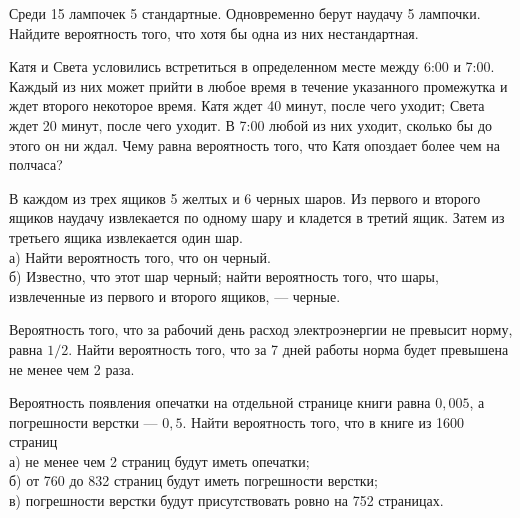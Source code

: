 \newpage\setcounter{zad}{0}



\begin{zkrW}{20}\noindent 
	Среди 15 лампочек 5 стандартные. Одновременно берут наудачу 5 лампочки. Найдите вероятность того, что хотя бы одна из них нестандартная.
 
\end{zkrW}

\begin{zkrW}{20}\noindent 
	Катя и Света условились встретиться в определенном месте между 6:00 и 7:00. Каждый из них может прийти в любое время в течение указанного промежутка и ждет второго некоторое время. Катя ждет 40 минут, после чего уходит; Света ждет 20 минут, после чего уходит. В 7:00 любой из них уходит, сколько бы до этого он ни ждал. Чему равна вероятность того, что Катя опоздает более чем на полчаса?
 
\end{zkrW}

\begin{zkrW}{20}\noindent 
	В каждом из трех ящиков 5 желтых и 6 черных шаров. Из первого и второго ящиков наудачу извлекается по одному шару и кладется в третий ящик. Затем из третьего ящика извлекается один шар. \\ \indent а) Найти вероятность того, что он черный. \\ \indent б) Известно, что этот шар черный; найти вероятность того, что шары, извлеченные из первого и второго ящиков, --- черные.
 
\end{zkrW}

\begin{zkrW}{20}\noindent 
	Вероятность того, что за рабочий день расход электроэнергии не превысит норму, равна $1/2$. Найти вероятность того, что за 7 дней работы норма будет превышена не менее чем 2 раза.
 
\end{zkrW}

\begin{zkrW}{20}\noindent 
	Вероятность появления опечатки на отдельной странице книги равна $0{,}005$, а погрешности верстки --- $0{,}5$. Найти вероятность того, что в книге из 1600 страниц \\ \indent а) не менее чем 2 страниц будут иметь опечатки; \\ \indent б) от 760 до 832 страниц будут иметь погрешности верстки; \\ \indent в) погрешности верстки будут присутствовать ровно на 752 страницах.
 
\end{zkrW}

